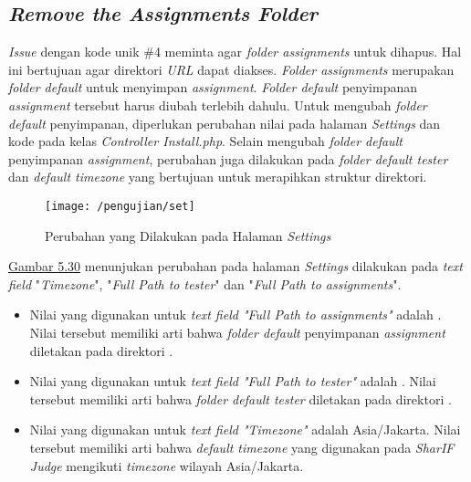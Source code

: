 	\subsection{\textit{Remove the Assignments Folder}}
	\textit{Issue} dengan kode unik \#4 meminta agar \textit{folder assignments} untuk dihapus. Hal ini bertujuan agar direktori \textit{URL}  dapat diakses. \textit{Folder assignments} merupakan \textit{folder default} untuk menyimpan \textit{assignment}. \textit{Folder default} penyimpanan \textit{assignment} tersebut harus diubah terlebih dahulu. Untuk mengubah \textit{folder default} penyimpanan, diperlukan perubahan nilai pada halaman \textit{Settings} dan kode pada kelas \textit{Controller Install.php}. Selain mengubah \textit{folder default} penyimpanan \textit{assignment}, perubahan juga dilakukan pada \textit{folder default tester} dan \textit{default timezone} yang bertujuan untuk merapihkan struktur direktori.
	\begin{figure}[H]
		\centering  
		\texttt{[image: /pengujian/set]}  
		\caption[Perubahan yang Dilakukan pada Halaman \textit{Settings}]{Perubahan yang Dilakukan pada Halaman \textit{Settings}} 
		\label{fig:set} 
	\end{figure}
	
	\hyperref[fig:set]{Gambar 5.30} menunjukan perubahan pada halaman \textit{Settings} dilakukan pada \textit{text field} "\textit{Timezone}", "\textit{Full Path to tester}" dan "\textit{Full Path to assignments}". 
	\begin{itemize}
		\item Nilai yang digunakan untuk\textit{ text field "Full Path to assignments"} adalah . Nilai tersebut memiliki arti bahwa \textit{folder default} penyimpanan \textit{assignment} diletakan pada direktori .
		\item Nilai yang digunakan untuk \textit{text field "Full Path to tester"} adalah . Nilai tersebut memiliki arti bahwa \textit{folder default tester} diletakan pada direktori .
		\item Nilai yang digunakan untuk \textit{text field "Timezone"} adalah Asia/Jakarta. Nilai tersebut memiliki arti bahwa \textit{default timezone} yang digunakan pada \textit{SharIF Judge} mengikuti \textit{timezone} wilayah Asia/Jakarta.
	\end{itemize}
	
